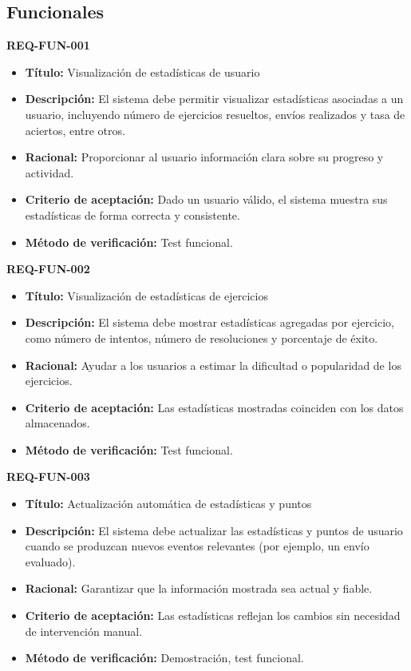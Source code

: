 \subsection{Funcionales}
\label{subsec:funcionales}

\textbf{REQ-FUN-001}
\begin{itemize}
    \item \textbf{Título:} Visualización de estadísticas de usuario
    \item \textbf{Descripción:} El sistema debe permitir visualizar estadísticas asociadas a un usuario, incluyendo número de ejercicios resueltos, envíos realizados y tasa de aciertos, entre otros.
    \item \textbf{Racional:} Proporcionar al usuario información clara sobre su progreso y actividad.
    \item \textbf{Criterio de aceptación:} Dado un usuario válido, el sistema muestra sus estadísticas de forma correcta y consistente.
    \item \textbf{Método de verificación:} Test funcional.

\end{itemize}

\textbf{REQ-FUN-002}
\begin{itemize}
    \item \textbf{Título:} Visualización de estadísticas de ejercicios
    \item \textbf{Descripción:} El sistema debe mostrar estadísticas agregadas por ejercicio, como número de intentos, número de resoluciones y porcentaje de éxito.
    \item \textbf{Racional:} Ayudar a los usuarios a estimar la dificultad o popularidad de los ejercicios.
    \item \textbf{Criterio de aceptación:} Las estadísticas mostradas coinciden con los datos almacenados.
    \item \textbf{Método de verificación:} Test funcional.

\end{itemize}

\textbf{REQ-FUN-003}
\begin{itemize}
    \item \textbf{Título:} Actualización automática de estadísticas y puntos
    \item \textbf{Descripción:} El sistema debe actualizar las estadísticas y puntos de usuario cuando se produzcan nuevos eventos relevantes (por ejemplo, un envío evaluado).
    \item \textbf{Racional:} Garantizar que la información mostrada sea actual y fiable.
    \item \textbf{Criterio de aceptación:} Las estadísticas reflejan los cambios sin necesidad de intervención manual.
    \item \textbf{Método de verificación:} Demostración, test funcional.

\end{itemize}

